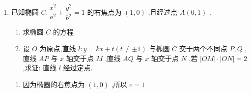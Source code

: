 \begin{enumerate}
\begin{jieda}
\begin{enumerate}
\begin{dingautolist}{172}
                根据韦达定理有$\left\{  {\begin{array}{l} {x}_{1} + {x}_{2} = \dfrac{-{6kt}}{1 + 3{k}^{2}}, \\  {x}_{1}{x}_{2} = \dfrac{3{t}^{2} - 9}{1 + 3{k}^{2}}, \end{array}}\right.$
                
                ${k}_{1}{k}_{2} = \dfrac{{y}_{1}{y}_{2}}{{x}_{1}{x}_{2}} =  - \dfrac{1}{3}$，代入直线方程可得$\dfrac{{y}_{1}{y}_{2}}{{x}_{1}{x}_{2}} = \dfrac{\left( {k{x}_{1} + t}\right) \left( {k{x}_{2} + t}\right) }{{x}_{1}{x}_{2}} = {k}^{2} + \dfrac{{kt}\left( {{x}_{1} + {x}_{2}}\right)  + {t}^{2}}{{x}_{1}{x}_{2}} = {k}^{2} + \dfrac{\dfrac{-6{k}^{2}{t}^{2}}{1 + 3{k}^{2}} + {t}^{2}}{\dfrac{3{t}^{2} - 9}{1 + 3{k}^{2}}} = \dfrac{{t}^{2} - 9{k}^{2}}{3{t}^{2} - 9} =  - \dfrac{1}{3},$
                
                整理得 $2{t}^{2} = 9{k}^{2} + 3$且$t^2 \neq 3$，故${t}^{2} \geq \dfrac{3}{2}$且$t^2 \neq 3$，经检验$\Delta  > 0$ 恒成立.
                
                $\vv{OA} \cdot  \vv{OB} = {x}_{1}{x}_{2} + {y}_{1}{y}_{2} = {x}_{1}{x}_{2} - \dfrac{1}{3}{x}_{1}{x}_{2} = \dfrac{2}{3}{x}_{1}{x}_{2} = \dfrac{2}{3} \cdot  \dfrac{3{t}^{2} - 9}{1 + 3{k}^{2}} = 3 \cdot  \dfrac{{t}^{2} - 3}{{t}^{2}} = 3\left( {1 - \dfrac{3}{{t}^{2}}}\right) \in  \lbrack  - 3,0) \cup  \left( {0,3}\right)$ .
            \end{dingautolist}
            综上, $\vv{OA} \cdot  \vv{OB}$ 的取值范围为 $\left\lbrack  {-3,0)\cup (0,3}\right\rbrack$ .
        \end{enumerate}
    \end{jieda}


    
    \item 已知椭圆 $C : \dfrac{{x}^{2}}{{a}^{2}} + \dfrac{{y}^{2}}{{b}^{2}} = 1$ 的右焦点为 $\left( {1,0}\right)$ ,且经过点 $A\left( {0,1}\right)$ .
    \begin{enumerate}
        \item 求椭圆 $C$ 的方程
        \item 设 $O$ 为原点,直线 $l : y = {kx} + t\left( {t \neq   \pm  1}\right)$ 与椭圆 $C$ 交于两个不同点 $P,Q$ ,直线 ${AP}$ 与 $x$ 轴交于点 $M$ ,直线 ${AQ}$ 与 $x$ 轴交于点 $N$ ,若 $\left| {OM}\right|  \cdot  \left| {ON}\right|  = 2$ ,求证: 直线 $l$ 经过定点.
    \end{enumerate}
    \begin{jieda}
    \begin{enumerate}
        \item 因为椭圆的右焦点为 $\left( {1,0}\right)$ ,所以 $c = 1$
        

\end{enumerate}
\end{jieda}
\end{enumerate}
